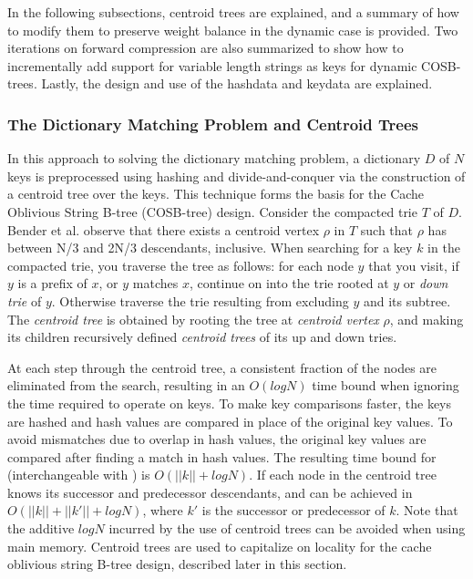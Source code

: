 \documentclass{style}
\begin{document}
In the following subsections, centroid trees are explained, and a summary of how to modify them to preserve weight balance in the dynamic case is provided. Two iterations on forward compression are also summarized to show how to incrementally add support for variable length strings as keys for dynamic COSB-trees. Lastly, the design and use of the hashdata and keydata are explained.

\subsubsection{The Dictionary Matching Problem and Centroid Trees} %
In this approach to solving the dictionary matching problem, a dictionary $D$ of $N$ keys is preprocessed using hashing and divide-and-conquer via the construction of a centroid tree over the keys. This technique forms the basis for the Cache Oblivious String B-tree (COSB-tree) design. Consider the compacted trie $T$ of $D$. Bender et al. observe that there exists a centroid vertex $\rho$ in $T$ such that $\rho$ has between N/3 and 2N/3 descendants, inclusive. When searching for a key $k$ in the compacted trie, you traverse the tree as follows: for each node $y$ that you visit, if $y$ is a prefix of $x$, or $y$ matches $x$, continue on into the trie rooted at $y$ or \emph{down trie} of $y$. Otherwise traverse the trie resulting from excluding $y$ and its subtree. The \emph{centroid tree} is obtained by rooting the tree at \emph{centroid vertex} $\rho$, and making its children recursively defined \emph{centroid trees} of its up and down tries. 

At each step through the centroid tree, a consistent fraction of the nodes are eliminated from the search, resulting in an $O(logN)$ time bound when ignoring the time required to operate on keys. To make key comparisons faster, the keys are hashed and hash values are compared in place of the original key values. To avoid mismatches due to overlap in hash values, the original key values are compared after finding a match in hash values. The resulting time bound for \Search{} (interchangeable with \Member{}) is $O(||k||+logN)$. If each node in the centroid tree knows its successor and predecessor descendants, \Pred{} and \Succ{} can be achieved in $O(||k||+||k'||+logN)$, where $k'$ is the successor or predecessor of $k$. Note that the additive $logN$ incurred by the use of centroid trees can be avoided when using main memory. Centroid trees are used to capitalize on locality for the cache oblivious string B-tree design, described later in this section.
\end{document}
